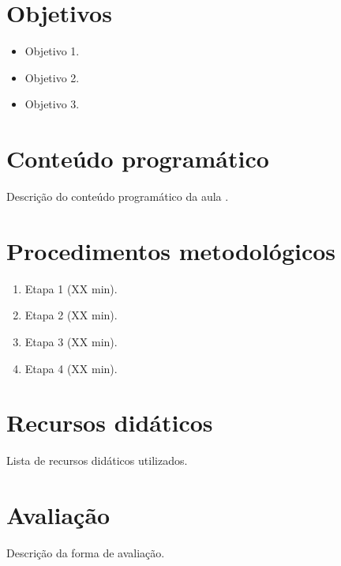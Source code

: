 \documentclass{lessonplan}
\begin{document}
\maketitle

\section{Objetivos}
\begin{itemize}
  \item Objetivo 1.
  \item Objetivo 2.
  \item Objetivo 3.
\end{itemize}

\section{Conteúdo programático}
Descrição do conteúdo programático da aula \cite{referencia1}.

\section{Procedimentos metodológicos}
\begin{enumerate}
  \item Etapa 1 (XX min).
  \item Etapa 2 (XX min).
  \item Etapa 3 (XX min).
  \item Etapa 4 (XX min).
\end{enumerate}

\section{Recursos didáticos}
Lista de recursos didáticos utilizados.

\section{Avaliação}
Descrição da forma de avaliação.

\lpprintbibliography
\end{document}
